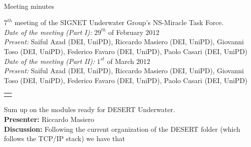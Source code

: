 \documentclass[11pt,journal,draftclsnofoot,onecolumn,twoside,letterpaper]{IEEEtran}
\theoremstyle{definition} \newtheorem{definition}[]{Definition}
\theoremstyle{theorem} \newtheorem{theorem}[]{Theorem}
\begin{document}
\pagestyle{empty}

\begin{Large} \\ \end{Large}
\begin{large} {Meeting minutes} \end{large}

\vspace{0.8cm}

 $7^{th}$ meeting of the SIGNET Underwater Group's NS-Miracle Task Force.\\
{\it Date of the meeting (Part I): } $29^{th}$ of February $2012$\\
{\it Present: } Saiful Azad (DEI, UniPD), Riccardo Masiero (DEI, UniPD), Giovanni Toso (DEI, UniPD), Federico Favaro (DEI, UniPD), Paolo Casari (DEI, UniPD)\\
{\it Date of the meeting (Part II): } $1^{st}$ of March $2012$\\
{\it Present: } Saiful Azad (DEI, UniPD), Riccardo Masiero (DEI, UniPD), Giovanni Toso (DEI, UniPD), Federico Favaro (DEI, UniPD), Paolo Casari (DEI, UniPD)

\vspace{0.5cm}

\begin{tabular}{p{}}
 \hline \\
\end{tabular}

 Sum up on the modules ready for DESERT Underwater.\\
{\bf Presenter:} Riccardo Masiero\\
{\bf Discussion:} Following the current organization of the DESERT folder (which follows the TCP/IP stack) we have that
\end{document}
